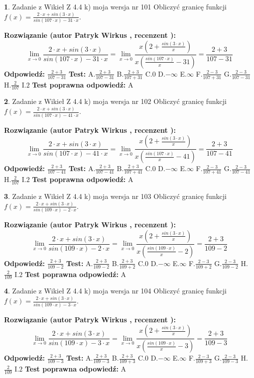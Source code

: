 \documentclass[12pt, a4paper]{article}
\theoremstyle{definition} %
\newtheorem{zad}{}
\newcommand{\zadStart}[1]{\begin{zad}#1\newline}
\newcommand{\zadStop}{\end{zad}}
\newcommand{\rozwStart}[2]{\noindent \textbf{Rozwiązanie (autor #1 , recenzent #2): }\newline}
\newcommand{\rozwStop}{\newline}
\newcommand{\odpStart}{\noindent \textbf{Odpowiedź:}\newline}
\newcommand{\odpStop}{\newline}
\newcommand{\testStart}{\noindent \textbf{Test:}\newline}
\newcommand{\testStop}{\newline}
\newcommand{\kluczStart}{\noindent \textbf{Test poprawna odpowiedź:}\newline}
\newcommand{\kluczStop}{\newline}
\begin{document}
\zadStart{Zadanie z Wikieł Z 4.4 k) moja wersja nr 101}
Obliczyć granicę funkcji $f(x)=\frac{2\cdot x +sin(3\cdot x)}{sin(107\cdot x) -31\cdot x}$.
\zadStop
\rozwStart{Patryk Wirkus}{}
$$\lim\limits_{x\to 0}\frac{2\cdot x +sin(3\cdot x)}{sin(107\cdot x) -31\cdot x}
=\lim\limits_{x\to 0}\frac{x(2+\frac{sin(3\cdot x)}{x})}{x(\frac{sin(107\cdot x)}{x}-31)}
=\frac{2+3}{107-31}$$
\rozwStop
\odpStart
$\frac{2+3}{107-31}$
\odpStop
\testStart
A.$\frac{2+3}{107-31}$
B.$\frac{2+3}{107+31}$
C.$0$
D.$-\infty$
E.$\infty$
F.$\frac{2-3}{107+31}$
G.$\frac{2-3}{107-31}$
H.$\frac{2}{107}$
I.$2$
\testStop
\kluczStart
A
\kluczStop



\zadStart{Zadanie z Wikieł Z 4.4 k) moja wersja nr 102}
Obliczyć granicę funkcji $f(x)=\frac{2\cdot x +sin(3\cdot x)}{sin(107\cdot x) -41\cdot x}$.
\zadStop
\rozwStart{Patryk Wirkus}{}
$$\lim\limits_{x\to 0}\frac{2\cdot x +sin(3\cdot x)}{sin(107\cdot x) -41\cdot x}
=\lim\limits_{x\to 0}\frac{x(2+\frac{sin(3\cdot x)}{x})}{x(\frac{sin(107\cdot x)}{x}-41)}
=\frac{2+3}{107-41}$$
\rozwStop
\odpStart
$\frac{2+3}{107-41}$
\odpStop
\testStart
A.$\frac{2+3}{107-41}$
B.$\frac{2+3}{107+41}$
C.$0$
D.$-\infty$
E.$\infty$
F.$\frac{2-3}{107+41}$
G.$\frac{2-3}{107-41}$
H.$\frac{2}{107}$
I.$2$
\testStop
\kluczStart
A
\kluczStop



\zadStart{Zadanie z Wikieł Z 4.4 k) moja wersja nr 103}
Obliczyć granicę funkcji $f(x)=\frac{2\cdot x +sin(3\cdot x)}{sin(109\cdot x) -2\cdot x}$.
\zadStop
\rozwStart{Patryk Wirkus}{}
$$\lim\limits_{x\to 0}\frac{2\cdot x +sin(3\cdot x)}{sin(109\cdot x) -2\cdot x}
=\lim\limits_{x\to 0}\frac{x(2+\frac{sin(3\cdot x)}{x})}{x(\frac{sin(109\cdot x)}{x}-2)}
=\frac{2+3}{109-2}$$
\rozwStop
\odpStart
$\frac{2+3}{109-2}$
\odpStop
\testStart
A.$\frac{2+3}{109-2}$
B.$\frac{2+3}{109+2}$
C.$0$
D.$-\infty$
E.$\infty$
F.$\frac{2-3}{109+2}$
G.$\frac{2-3}{109-2}$
H.$\frac{2}{109}$
I.$2$
\testStop
\kluczStart
A
\kluczStop



\zadStart{Zadanie z Wikieł Z 4.4 k) moja wersja nr 104}
Obliczyć granicę funkcji $f(x)=\frac{2\cdot x +sin(3\cdot x)}{sin(109\cdot x) -3\cdot x}$.
\zadStop
\rozwStart{Patryk Wirkus}{}
$$\lim\limits_{x\to 0}\frac{2\cdot x +sin(3\cdot x)}{sin(109\cdot x) -3\cdot x}
=\lim\limits_{x\to 0}\frac{x(2+\frac{sin(3\cdot x)}{x})}{x(\frac{sin(109\cdot x)}{x}-3)}
=\frac{2+3}{109-3}$$
\rozwStop
\odpStart
$\frac{2+3}{109-3}$
\odpStop
\testStart
A.$\frac{2+3}{109-3}$
B.$\frac{2+3}{109+3}$
C.$0$
D.$-\infty$
E.$\infty$
F.$\frac{2-3}{109+3}$
G.$\frac{2-3}{109-3}$
H.$\frac{2}{109}$
I.$2$
\testStop
\kluczStart
A
\kluczStop
\end{document}
